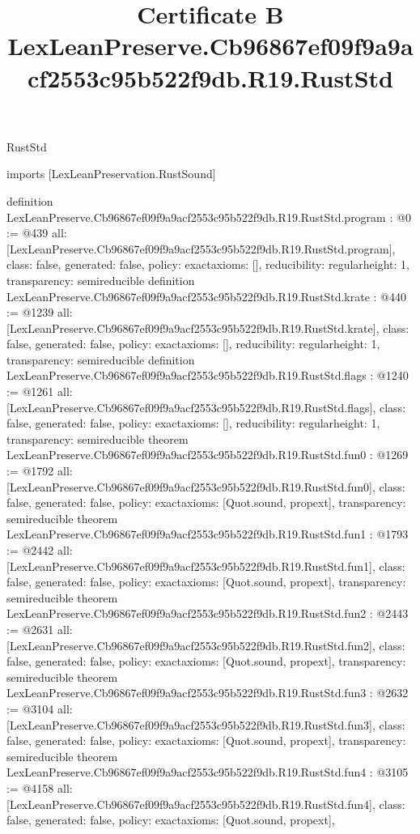 \begin{lexlean}{RustStd}
\title{Certificate B LexLeanPreserve.Cb96867ef09f9a9acf2553c95b522f9db.R19.RustStd}
\begin{coremodule}
imports [LexLeanPreservation.RustSound]

definition LexLeanPreserve.Cb96867ef09f9a9acf2553c95b522f9db.R19.RustStd.program : @0 := @439 {
  all: [LexLeanPreserve.Cb96867ef09f9a9acf2553c95b522f9db.R19.RustStd.program],
  class: false,
  generated: false,
  policy: exact{axioms: []},
  reducibility: regular{height: 1},
  transparency: semireducible
}
definition LexLeanPreserve.Cb96867ef09f9a9acf2553c95b522f9db.R19.RustStd.krate : @440 := @1239 {
  all: [LexLeanPreserve.Cb96867ef09f9a9acf2553c95b522f9db.R19.RustStd.krate],
  class: false,
  generated: false,
  policy: exact{axioms: []},
  reducibility: regular{height: 1},
  transparency: semireducible
}
definition LexLeanPreserve.Cb96867ef09f9a9acf2553c95b522f9db.R19.RustStd.flags : @1240 := @1261 {
  all: [LexLeanPreserve.Cb96867ef09f9a9acf2553c95b522f9db.R19.RustStd.flags],
  class: false,
  generated: false,
  policy: exact{axioms: []},
  reducibility: regular{height: 1},
  transparency: semireducible
}
theorem LexLeanPreserve.Cb96867ef09f9a9acf2553c95b522f9db.R19.RustStd.fun0 : @1269 := @1792 {
  all: [LexLeanPreserve.Cb96867ef09f9a9acf2553c95b522f9db.R19.RustStd.fun0],
  class: false,
  generated: false,
  policy: exact{axioms: [Quot.sound, propext]},
  transparency: semireducible
}
theorem LexLeanPreserve.Cb96867ef09f9a9acf2553c95b522f9db.R19.RustStd.fun1 : @1793 := @2442 {
  all: [LexLeanPreserve.Cb96867ef09f9a9acf2553c95b522f9db.R19.RustStd.fun1],
  class: false,
  generated: false,
  policy: exact{axioms: [Quot.sound, propext]},
  transparency: semireducible
}
theorem LexLeanPreserve.Cb96867ef09f9a9acf2553c95b522f9db.R19.RustStd.fun2 : @2443 := @2631 {
  all: [LexLeanPreserve.Cb96867ef09f9a9acf2553c95b522f9db.R19.RustStd.fun2],
  class: false,
  generated: false,
  policy: exact{axioms: [Quot.sound, propext]},
  transparency: semireducible
}
theorem LexLeanPreserve.Cb96867ef09f9a9acf2553c95b522f9db.R19.RustStd.fun3 : @2632 := @3104 {
  all: [LexLeanPreserve.Cb96867ef09f9a9acf2553c95b522f9db.R19.RustStd.fun3],
  class: false,
  generated: false,
  policy: exact{axioms: [Quot.sound, propext]},
  transparency: semireducible
}
theorem LexLeanPreserve.Cb96867ef09f9a9acf2553c95b522f9db.R19.RustStd.fun4 : @3105 := @4158 {
  all: [LexLeanPreserve.Cb96867ef09f9a9acf2553c95b522f9db.R19.RustStd.fun4],
  class: false,
  generated: false,
  policy: exact{axioms: [Quot.sound, propext]},
}
\end{coremodule}
\end{lexlean}
